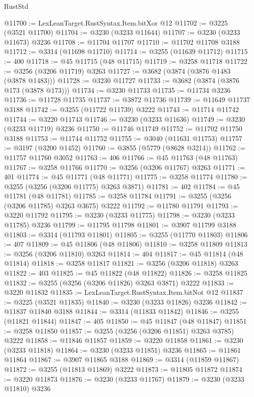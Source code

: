 \begin{lexlean}{RustStd}
\begin{coremodule}
{\begin{coremodule}
{{{{{{{{{{{{{{{{{{{{{{{{{{{{{{{{{{{{{@11700 := LexLeanTarget.RustSyntax.Item.bitXor @12
@11702 := @3225 (@3521 @11700)
@11704 := @3230 (@3233 @11644)
@11707 := @3230 (@3233 @11673) @3236
@11708 := @11704 @11707
@11710 := @11702 @11708 @3188
@11712 := @3314 (@11698 @11710)
@11714 := @3255 (@11639 @11712)
@11715 := 400
@11718 := @45 @11715 (@48 @11715)
@11719 := @3258 @11718
@11722 := @3256 (@3206 @11719) @3263
@11727 := @3682 (@3874 (@3876 @1483 (@3878 @1483)))
@11728 := @3230 @11727
@11733 := @3682 (@3874 (@3876 @173 (@3878 @173)))
@11734 := @3230 @11733
@11735 := @11734 @3236
@11736 := @11728 @11735
@11737 := @3872 @11736
@11739 := @11649 @11737 @3188
@11742 := @3255 (@11722 @11739) @3222
@11743 := @11714 @11742
@11744 := @3220 @11743
@11746 := @3230 (@3233 @11636)
@11749 := @3230 (@3233 @11719) @3236
@11750 := @11746 @11749
@11752 := @11702 @11750 @3188
@11753 := @11744 @11752
@11755 := @3040 (@11631 @11753)
@11757 := @3197 (@3200 @1452)
@11760 := @3855 (@5779 (@8628 @3214))
@11762 := @11757 @11760 @3052
@11763 := 406
@11766 := @45 @11763 (@48 @11763)
@11767 := @3258 @11766
@11770 := @3256 (@3206 @11767) @3263
@11771 := 401
@11774 := @45 @11771 (@48 @11771)
@11775 := @3258 @11774
@11780 := @3255 (@3256 (@3206 @11775) @3263 @3871)
@11781 := 402
@11784 := @45 @11781 (@48 @11781)
@11785 := @3258 @11784
@11791 := @3255 (@3256 (@3206 @11785) @3263 @3675) @3222
@11792 := @11780 @11791
@11793 := @3220 @11792
@11795 := @3230 (@3233 @11775)
@11798 := @3230 (@3233 @11785) @3236
@11799 := @11795 @11798
@11801 := @3907 @11799 @3188
@11803 := @3314 (@11793 @11801)
@11805 := @3255 (@11770 @11803)
@11806 := 407
@11809 := @45 @11806 (@48 @11806)
@11810 := @3258 @11809
@11813 := @3256 (@3206 @11810) @3263
@11814 := 404
@11817 := @45 @11814 (@48 @11814)
@11818 := @3258 @11817
@11821 := @3256 (@3206 @11818) @3263
@11822 := 403
@11825 := @45 @11822 (@48 @11822)
@11826 := @3258 @11825
@11832 := @3255 (@3256 (@3206 @11826) @3263 @3871) @3222
@11833 := @3220 @11832
@11835 := LexLeanTarget.RustSyntax.Item.bitNot @12
@11837 := @3225 (@3521 @11835)
@11840 := @3230 (@3233 @11826) @3236
@11842 := @11837 @11840 @3188
@11844 := @3314 (@11833 @11842)
@11846 := @3255 (@11821 @11844)
@11847 := 405
@11850 := @45 @11847 (@48 @11847)
@11851 := @3258 @11850
@11857 := @3255 (@3256 (@3206 @11851) @3263 @3785) @3222
@11858 := @11846 @11857
@11859 := @3220 @11858
@11861 := @3230 (@3233 @11818)
@11864 := @3230 (@3233 @11851) @3236
@11865 := @11861 @11864
@11867 := @3907 @11865 @3188
@11869 := @3314 (@11859 @11867)
@11872 := @3255 (@11813 @11869) @3222
@11873 := @11805 @11872
@11874 := @3220 @11873
@11876 := @3230 (@3233 @11767)
@11879 := @3230 (@3233 @11810) @3236
}}}}}}}}}}}}}}}}}}}}}}}}}}}}}}}}}}}}}
\end{coremodule}}
\end{coremodule}
\end{lexlean}
